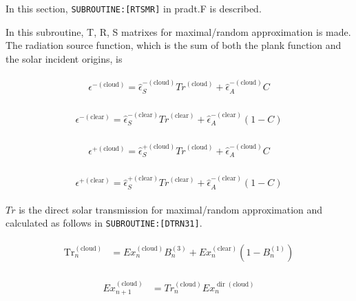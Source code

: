 In this section, \texttt{SUBROUTINE:{[}RTSMR{]}} in pradt.F is described.

In this subroutine, T, R, S matrixes for maximal/random approximation is made. The radiation source function, which is the sum of both the plank function and the solar incident origins, is

\begin{eqnarray}
\begin{array}{l}
\epsilon^{-(\text {cloud})}=\hat{\epsilon}_{S}^{-(\text {cloud})} {Tr}^{(\text {cloud})}+\hat{\epsilon}_{A}^{-(\text {cloud})} C
\end{array}
\end{eqnarray}

\begin{eqnarray}
\begin{array}{l}
\epsilon^{-(\text {clear})}=\hat{\epsilon}_{S}^{-(\text {clear})}{Tr}^{(\text {clear})}+\hat{\epsilon}_{A}^{-(\text {clear})}(1-C)
\end{array}
\end{eqnarray}

\begin{eqnarray}
\begin{array}{l}
\epsilon^{+(\text {cloud})}=\hat{\epsilon}_{S}^{+(\text {cloud})}{Tr}^{(\text {cloud})}+\hat{\epsilon}_{A}^{-(\text {cloud})} C
\end{array}
\end{eqnarray}

\begin{eqnarray}
\begin{array}{l}
\epsilon^{+(\text {clear})}=\hat{\epsilon}_{S}^{+(\text {clear})}{Tr}^{(\text {clear})}+\hat{\epsilon}_{A}^{-(\text {clear})}(1-C)
\end{array}
\end{eqnarray}

\(Tr\) is the direct solar transmission for maximal/random approximation and calculated as follows in \texttt{SUBROUTINE:{[}DTRN31{]}}.

\begin{eqnarray}
\begin{aligned}
\operatorname{Tr}_{n}^{(\text {cloud})} &=E x_{n}^{(\text {cloud})} B_{n}^{(3)}+E x_{n}^{(\text {clear})}\left(1-B_{n}^{(1)}\right)
\end{aligned}
\end{eqnarray}

\begin{eqnarray}
\begin{aligned}
E x_{n+1}^{(\text {cloud})} &={Tr}_{n}^{(\text {cloud})} E x_{n}^{\operatorname{dir}(\text {cloud})}
\end{aligned}
\end{eqnarray}

